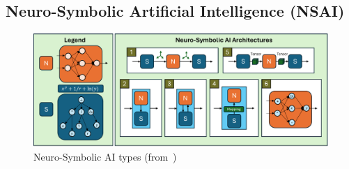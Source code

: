 \documentclass[12pt]{extarticle}
\begin{document}
\subsection{Neuro-Symbolic Artificial Intelligence (NSAI)}

\begin{figure}[htbp]
    \centering
    \includegraphics[width=0.8\linewidth]{nsai-types}
    \caption{Neuro-Symbolic AI types
    (from~\cite{nsai})}
    \label{fig:nsai-types}
\end{figure}
\end{document}
